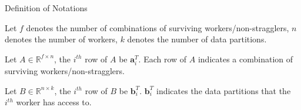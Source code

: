 \documentclass{beamer}
\begin{document}


\begin{frame}{Definition of Notations}

\begin{definition}
    Let $f$ denotes the number of combinations of surviving workers/non-stragglers, $n$ denotes the number of workers, $k$ denotes the number of data partitions.
\end{definition}

\begin{definition}
    Let $A \in \mathbb{R}^{f \times n}$, the $i^{th}$ row of $A$ be $\boldsymbol{a}_i^T$. Each row of $A$ indicates a combination of surviving workers/non-stragglers.
\end{definition}

\begin{definition}
    Let $B \in \mathbb{R}^{n \times k}$, the $i^{th}$ row of $B$ be $\boldsymbol{b}_i^T$. $\boldsymbol{b}_i^T$ indicates the data partitions that the $i^{th}$ worker has access to.
\end{definition}

\end{frame}
\end{document}
